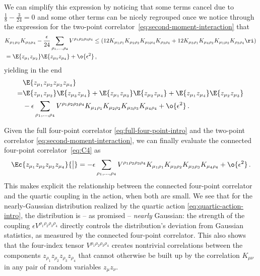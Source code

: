 We can simplify this expression by noticing that some terms cancel due to $\frac{1}{8}-\frac{3}{24}=0$ and some other terms can be nicely regrouped once we notice  through the expression for the two-point correlator~\eqref{eq:second-moment-interaction} that
\begin{align}
&K_{\mu_1\mu_2}K_{\mu_3\mu_4}-\frac{\epsilon}{24}\sum_{\rho_1,\ldots,\rho_4}V^{\rho_1\rho_2\rho_3\rho_4}\le(12K_{\mu_1\rho_1}K_{\mu_2\rho_2}K_{\mu_3\mu_4}K_{\rho_3\rho_4}+12K_{\mu_3\rho_1}K_{\mu_4\rho_2}K_{\mu_1\mu_2}K_{\rho_3\rho_4}\ri)\, \nonumber\\
&=\E{z_{\mu_1}z_{\mu_2}}\E{z_{\mu_3}z_{\mu_4}}+\o{\epsilon^2}\, ,
\end{align}
yielding in the end
\begin{align}
&\E{z_{\mu_1}z_{\mu_2}z_{\mu_3}z_{\mu_4}}\, \\
=&\E{z_{\mu_1}z_{\mu_2}}\E{z_{\mu_3}z_{\mu_4}}+\E{z_{\mu_1}z_{\mu_3}}\E{z_{\mu_2}z_{\mu_4}}+\E{z_{\mu_1}z_{\mu_4}}\E{z_{\mu_2}z_{\mu_3}}\, \nonumber\\
&-\epsilon\sum_{\rho_1,\ldots,\rho_4}V^{\rho_1\rho_2\rho_3\rho_4} K_{\mu_1\rho_1}K_{\mu_2\rho_2}K_{\mu_3\rho_3}K_{\mu_4\rho_4}+\o{\epsilon^2}\, .\nonumber
\end{align}

Given the full four-point correlator \eqref{eq:full-four-point-intro} and the two-point correlator \eqref{eq:second-moment-interaction},
we can finally evaluate the connected four-point correlator~\eqref{eq:C4} 
as
\begin{align}\label{eq:single-variable-connected-four-point}
\Ec{z_{\mu_1} z_{\mu_2}z_{\mu_3}z_{\mu_4}}{\big|} = -\epsilon\sum_{\rho_1,\ldots,\rho_4}V^{\rho_1\rho_2\rho_3\rho_4} K_{\mu_1\rho_1}K_{\mu_2\rho_2}K_{\mu_3\rho_3}K_{\mu_4\rho_4}+\o{\epsilon^2}\, .
\end{align}
This makes explicit the relationship between the connected four-point correlator and the quartic coupling in the action, when both are small.
We see that for the nearly-Gaussian distribution realized by the quartic action \eqref{eq:quartic-action-intro}, the distribution is -- as promised -- \emph{nearly} Gaussian: the strength of the coupling $\epsilon V^{\rho_1\rho_2\rho_3\rho_4}$ directly controls the distribution's deviation from Gaussian statistics, as measured by the connected four-point correlator. This also shows that the four-index tensor $V^{\rho_1\rho_2\rho_3\rho_4}$ creates nontrivial correlations between the components $z_{\rho_1}z_{\rho_2}z_{\rho_3}z_{\rho_4}$ that cannot otherwise be built up by the  correlation $K_{\mu\nu}$ in any pair of random variables $z_{\mu}z_{\nu}$.

